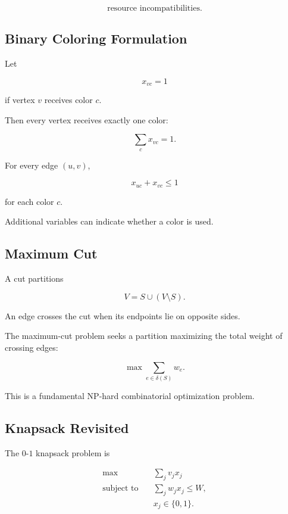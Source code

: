 \[
\boxed{
\text{resource incompatibilities}.
}
\]

\subsection{Binary Coloring Formulation}
\label{subsec:binary-coloring-formulation}

Let

\[
x_{vc}
=
1
\]

if vertex \(v\) receives color \(c\).

Then every vertex receives exactly one color:

\[
\boxed{
\sum_c
x_{vc}
=
1.
}
\]

For every edge \((u,v)\),

\[
\boxed{
x_{uc}+x_{vc}
\leq1
}
\]

for each color \(c\).

Additional variables can indicate whether a color is used.

\subsection{Maximum Cut}
\label{subsec:maximum-cut}

A cut partitions

\[
V
=
S\cup(V\setminus S).
\]

An edge crosses the cut when its endpoints lie on opposite sides.

The maximum-cut problem seeks a partition maximizing the total weight of
crossing edges:

\[
\boxed{
\max
\sum_{e\in\delta(S)}
w_e.
}
\]

This is a fundamental NP-hard combinatorial optimization problem.

\subsection{Knapsack Revisited}
\label{subsec:knapsack-combinatorial}

The \(0\)-\(1\) knapsack problem is

\[
\boxed{
\begin{aligned}
\max
\quad&
\sum_j
v_jx_j
\\
\text{subject to}
\quad&
\sum_j
w_jx_j
\leq
W,
\\
&
x_j\in\{0,1\}.
\end{aligned}
}
\]

